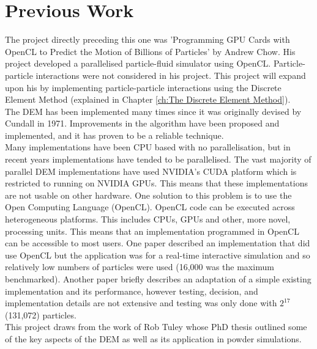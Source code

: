 \documentclass[10pt,a4paper,titlepage]{report}
\begin{document}
\section{Previous Work}
The project directly preceding this one was 'Programming GPU Cards with OpenCL to Predict the Motion of Billions of Particles'\cite{achow} by Andrew Chow. His project developed a parallelised particle-fluid simulator using OpenCL. Particle-particle interactions were not considered in his project. This project will expand upon his by implementing particle-particle interactions using the Discrete Element Method (explained in Chapter \ref{ch:The Discrete Element Method}).
\\The DEM has been implemented many times since it was originally devised by Cundall in 1971\cite{cundallphd}. Improvements in the algorithm have been proposed and implemented, and it has proven to be a reliable technique.
\\Many implementations have been CPU based with no parallelisation, but in recent years implementations have tended to be parallelised. The vast majority of parallel DEM implementations\cite{blazedem}\cite{GAN20161172}\cite{demcuda1}\cite{demcuda2}\cite{demcuda3} have used NVIDIA's CUDA platform which is restricted to running on NVIDIA GPUs. This means that these implementations are not usable on other hardware. One solution to this problem is to use the Open Computing Language (OpenCL). OpenCL code can be executed across heterogeneous platforms. This includes CPUs, GPUs and other, more novel, processing units. This means that an implementation programmed in OpenCL can be accessible to most users. One paper described an implementation that did use OpenCL but the application was for a real-time interactive simulation and so relatively low numbers of particles were used (16,000 was the maximum benchmarked)\cite{kinect}. Another paper briefly describes an adaptation of a simple existing implementation and its performance, however testing, decision, and implementation details are not extensive and testing was only done with $2^{17}$ (131,072) particles\cite{washizawa}.
\\This project draws from the work of Rob Tuley whose PhD thesis\cite{tuley} outlined some of the key aspects of the DEM as well as its application in powder simulations.
\end{document}
